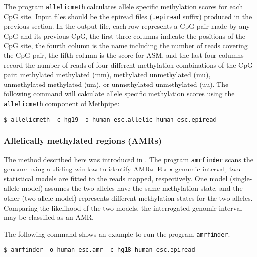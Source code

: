 \documentclass[10pt]{article}
\newcommand{\prog}[1]{\texttt{#1}}
\newcommand{\fn}[1]{\texttt{#1}}
\begin{document}
{{The program \prog{allelicmeth} calculates allele specific methylation
scores for each CpG site. Input files should be the epiread files
(\fn{.epiread} suffix) produced in the previous section. In the
output file, each row represents a CpG pair made by any CpG and its
previous CpG, the first three columns indicate the positions of the
CpG site, the fourth column is the name including the number of reads
covering the CpG pair, the fifth column is the score for ASM, and the
last four columns record the number of reads of four different
methylation combinations of the CpG pair: methylated methylated (mm),
methylated unmethylated (mu), unmethylated methylated (um), or
unmethylated unmethylated (uu). The following command will calculate
allele specific methylation scores using the \prog{allelicmeth}
component of Methpipe:

\begin{verbatim}
$ allelicmeth -c hg19 -o human_esc.allelic human_esc.epiread
\end{verbatim}

\subsubsection{Allelically methylated regions (AMRs)}

The method described here was introduced in \cite{fang2012genomic}.
The program \prog{amrfinder} scans the genome using a sliding window
to identify AMRs. For a genomic interval, two statistical models are
fitted to the reads mapped, respectively. One model (single-allele
model) assumes the two alleles have the same methylation state, and
the other (two-allele model) represents different methylation states
for the two alleles. Comparing the likelihood of the two models, the
interrogated genomic interval may be classified as an AMR.

The following command shows an example to run the program
\prog{amrfinder}.
\begin{verbatim}
$ amrfinder -o human_esc.amr -c hg18 human_esc.epiread
\end{verbatim}

}}
\end{document}
